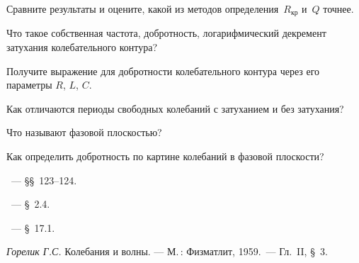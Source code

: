 \begin{lab:task}
\item Сравните результаты и оцените, какой из методов определения~$R_\text{кр}$ и~$Q$ 
точнее.

\end{lab:task}


\begin{lab:questions}
	\item Что такое собственная частота, добротность, логарифмический декремент
затухания колебательного контура?
    \item Получите выражение для добротности колебательного контура через его 
    параметры $R$, $L$, $C$.
    \item Как отличаются периоды свободных колебаний с затуханием и без затухания?
	\item Что называют фазовой плоскостью?
	\item  Как определить добротность по картине колебаний в фазовой плоскости?
\end{lab:questions}


\begin{lab:literature}
	\item \SivuhinIII~--- \S\S~123--124.
	\item \KingLokOlh~--- \S~2.4.
	\item \Kirichenko~--- \S~17.1.
	\item \textit{Горелик Г.С.} Колебания и волны. --- М.\,: Физматлит, 1959.~--- 
	Гл.~II, \S~3.
\end{lab:literature}
